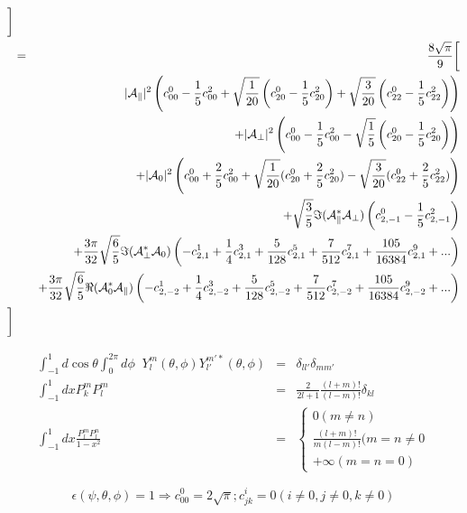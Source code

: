 \documentclass[a4paper,9pt,twoside]{article}
\begin{document}
\begin{eqnarray}
      \biggr] \\
      &=& \frac{8\sqrt{\pi}}{9}  \biggl[ \\
         &&                    |{\cal A}_\parallel|^2 \left( c^0_{00}-\frac{1}{5}c^2_{00}+\sqrt{\frac{1}{20}}\left(c^0_{20}-\frac{1}{5}c^2_{20}\right)+\sqrt{\frac{3}{20}}\left(c^0_{22}-\frac{1}{5}c^2_{22}\right)  \right)  \\
         &&                   +|{\cal A}_\perp|^2    \left( c^0_{00}-\frac{1}{5}c^2_{00} - \sqrt{\frac{1}{5}}\left(c^0_{20}-\frac{1}{5}c^2_{20}\right)\right)\\
         &&                   +|{\cal A}_0|^2   \left( c^0_{00}+\frac{2}{5}c^2_{00}+\sqrt{\frac{1}{20}}(c^0_{20}+\frac{2}{5}c^2_{20})-\sqrt{\frac{3}{20}}(c^0_{22}+\frac{2}{5}c^2_{22}) \right) \\
         &&                   +\sqrt{\frac{3}{5}}\Im({\cal A}_\parallel^*{\cal A}_\perp)\left(c^0_{2,-1}-\frac{1}{5}c^2_{2,-1}\right)  \\
         &&                   +\frac{3\pi}{32}\sqrt{\frac{6}{5}}\Im({\cal A}_\perp^* {\cal A}_0 )  \left( -c^1_{2,1} +\frac{1}{4}c^3_{2,1}+ \frac{5}{128}c^5_{2,1} +\frac{7}{512}c^7_{2,1} + \frac{105}{16384}c^9_{2,1}+... \right) \\
         &&                   +\frac{3\pi}{32}\sqrt{\frac{6}{5}}\Re({\cal A}_0^*{\cal A}_\parallel)\left( -c^1_{2,-2}+\frac{1}{4}c^3_{2,-2}+\frac{5}{128}c^5_{2,-2}+\frac{7}{512}c^7_{2,-2} + \frac{105}{16384}c^9_{2,-2}+... \right) \\
      \biggr]
\end{eqnarray}

\begin{eqnarray}
\int_{-1}^1 d\cos\theta \int_0^{2\pi} d\phi \;\;Y_l^m(\theta,\phi) Y_{l'}^{m'*}(\theta,\phi) &=& \delta_{ll'}\delta_{mm'}\\
\int_{-1}^1 dx  P_k^m P_l^m&=& \frac{2}{2l+1}\frac{(l+m)!}{(l-m)!}\delta_{kl} \\
\int_{-1}^1 dx \frac{P^m_l P^n_l } { 1 - x^2 }  &=&  \left\{  \begin{array}{l} 0 (m\neq n) \\   \frac{(l+m)!}{m(l-m)!}(m=n\neq 0\\ +\infty (m=n=0) \end{array} \right.
\end{eqnarray}


\begin{equation}
   \epsilon(\psi,\theta,\phi) = 1 \Rightarrow c^0_{00} = 2\sqrt{\pi} ; c^{i}_{jk} = 0 (i\neq 0, j\neq 0, k \neq 0)
\end{equation}
\end{document}
